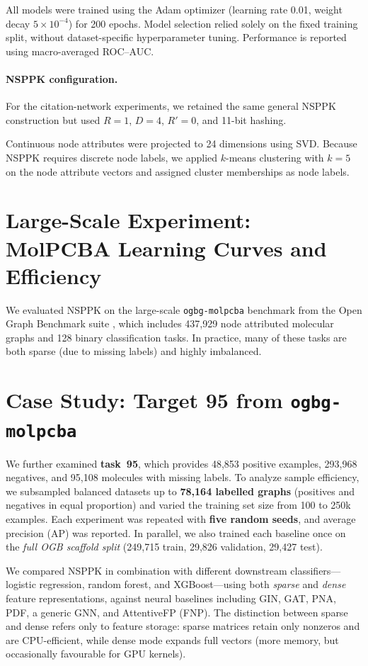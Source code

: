 All models were trained using the Adam optimizer
(learning rate 0.01, weight decay $5\times10^{-4}$) for 200 epochs.
Model selection relied solely on the fixed training split,
without dataset-specific hyperparameter tuning.
Performance is reported using macro-averaged ROC--AUC.

\paragraph{NSPPK configuration.}
For the citation-network experiments, we retained the same general NSPPK
construction but used $R=1$, $D=4$, $R'=0$, and 11-bit hashing.

Continuous node attributes were projected to 24 dimensions using SVD.
Because NSPPK requires discrete node labels, we applied $k$-means
clustering with $k=5$ on the node attribute vectors and assigned
cluster memberships as node labels.


\section{Large-Scale Experiment: MolPCBA Learning Curves and Efficiency}
\label{appendix:molpcba}

We evaluated NSPPK on the large-scale \texttt{ogbg-molpcba} benchmark from the Open Graph Benchmark suite \cite{hu2020ogb}, which includes  437,929 node attributed molecular graphs and 128 binary classification tasks.  
In practice, many of these tasks are both sparse (due to missing labels) and highly imbalanced.





\section{Case Study: Target 95 from \texttt{ogbg-molpcba}}
We further examined \textbf{task~95}, which provides 48,853 positive examples, 293,968 negatives, and 95,108 molecules with missing labels. 
To analyze sample efficiency, we subsampled balanced datasets up to \textbf{78,164 labelled graphs} (positives and negatives in equal proportion) and varied the training set size from 100 to 250k examples.  
Each experiment was repeated with \textbf{five random seeds}, and average precision (AP) was reported.  
In parallel, we also trained each baseline once on the \emph{full OGB scaffold split} (249,715 train, 29,826 validation, 29,427 test).  

We compared NSPPK in combination with different downstream classifiers—logistic regression, random forest, and XGBoost—using both \emph{sparse} and \emph{dense} feature representations, against neural baselines including GIN, GAT, PNA, PDF, a generic GNN, and AttentiveFP (FNP).  
The distinction between sparse and dense refers only to feature storage: sparse matrices retain only nonzeros and are CPU-efficient, while dense mode expands full vectors (more memory, but occasionally favourable for GPU kernels).

